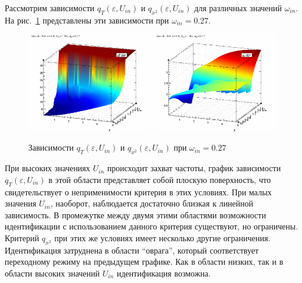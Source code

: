 Рассмотрим зависимости $q_T(\varepsilon,U_{in})$ и $q_{x^2}(\varepsilon,U_{in})$
для различных значений $\omega_{in}$.
На  рис.~\ref{atu:f:vdp_q2_027}
представлены эти зависимости при $\omega_{in}=0.27$.


\begin{figure}[ht!]
\begin{center}
  \includegraphics[width=0.49\textwidth]{p/cha/vdp/vdp_q_2d-p_qT_ome_0x27.png}
  \hfill
  \includegraphics[width=0.49\textwidth]{p/cha/vdp/vdp_q_2d-p_qx2_ome_0x27.png}
\end{center}
  \caption{Зависимости $q_T(\varepsilon,U_{in})$ и $q_{x^2}(\varepsilon,U_{in})$  при $\omega_{in}=0.27$}
\label{atu:f:vdp_q2_027}
\end{figure}

При высоких значениях $U_{in}$ происходит захват частоты,
график зависимости $q_T(\varepsilon,U_{in})$ в этой области
представляет собой плоскую поверхность, что свидетельствует
о неприменимости критерия в этих условиях. При малых значения $U_{in}$,
наоборот, наблюдается достаточно близкая к линейной зависимость.
В промежутке между двумя этими областями возможности
идентификации с использованием данного критерия существуют, но ограничены.
Критерий $q_{x^2}$ при этих же условиях имеет несколько другие ограничения.
Идентификация затруднена в области ``оврага'', который соответствует
переходному режиму на предыдущем графике.
Как в области низких, так и в области высоких значений
$U_{in}$ идентификация возможна.

